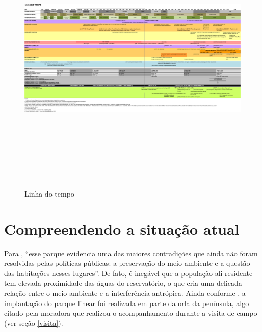 	\begin{landscape}
		\begin{figure}
			\centering
			\caption{Linha do tempo}
			\includegraphics[height=12.6cm,keepaspectratio]{img/matsunaga_linha}
			\label{fig:matsunaga_linha}
		\end{figure}
	\end{landscape}
	
	\chapter{Compreendendo a situação atual} \label{hoje}
	
	Para , ``esse parque evidencia uma das maiores contradições que ainda não foram resolvidas pelas políticas públicas: a preservação do meio ambiente e a questão das habitações nesses lugares''. De fato, é inegável que a população ali residente tem elevada proximidade das águas do reservatório, o que cria uma delicada relação entre o meio-ambiente e a interferência antrópica. Ainda conforme , a implantação do parque linear foi realizada em parte da orla da península, algo citado pela moradora que realizou o acompanhamento durante a visita de campo (ver seção \ref{visita}).
	
